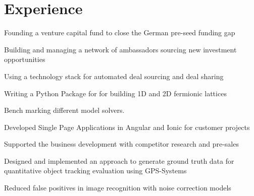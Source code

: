 \documentclass[]{deedy-resume-openfont}
\begin{document}
\hfill
\begin{minipage}[t]{0.66\textwidth} 


\section{Experience}
\vspace{\topsep} %
\begin{tightemize}
\item Founding a venture capital fund to close the German pre-seed funding gap
\item Building and managing a network of ambassadors sourcing new investment opportunities
\item Using a technology stack for automated deal sourcing and deal sharing
\end{tightemize}
\sectionsep

\begin{tightemize}
\item Writing a Python Package for for building 1D and 2D fermionic lattices
\item Bench marking different model solvers.
\end{tightemize}
\sectionsep

\begin{tightemize}
\item Developed Single Page Applications in Angular and Ionic for customer projects
\item Supported the business development with competitor research and pre-sales
\end{tightemize}
\sectionsep

\begin{tightemize}
\item Designed and implemented an approach to generate ground truth data for quantitative object tracking evaluation using GPS-Systems
\item Reduced false positives in image recognition with noise correction models
\end{tightemize}
\sectionsep


\end{minipage}
\end{document}
